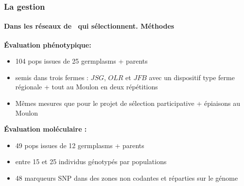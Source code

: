 \begin{frame}
\frametitle{La gestion \insitu}
\framesubtitle{Dans les réseaux de \MSPs~qui sélectionnent. Méthodes}

\textbf{Évaluation phénotypique:}
\begin{itemize}
\item 104 pops issues de 25 germplasms + parents %
\item semis dans trois fermes : $JSG$, $OLR$ et $JFB$ avec un dispositif type ferme régionale + tout au Moulon en deux répétitions
\item Mêmes mesures que pour le projet de sélection participative + épiaisons au Moulon
\end{itemize}

\vfill

\textbf{Évaluation moléculaire : }
\begin{itemize}
\item 49 pops issues de 12 germplasms + parents %
\item entre 15 et 25 individus génotypés par populations
\item 48 marqueurs SNP dans des zones non codantes et réparties sur le génome
\end{itemize}

\end{frame}



